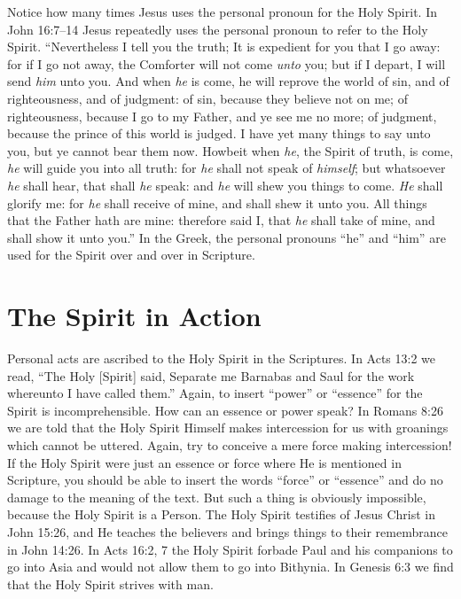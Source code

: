 Notice how many times Jesus uses the personal pronoun
for the Holy Spirit. In John 16:7–14 Jesus repeatedly
uses the personal pronoun to refer to the Holy Spirit. “Nevertheless
I tell you the truth; It is expedient for you that I go
away: for if I go not away, the Comforter will not come \emph{unto}
you; but if I depart, I will send \emph{him} unto you. And when \emph{he}
is come, he will reprove the world of sin, and of righteousness,
and of judgment: of sin, because they believe not on
me; of righteousness, because I go to my Father, and ye see
me no more; of judgment, because the prince of this world
is judged. I have yet many things to say unto you, but ye
cannot bear them now. Howbeit when \emph{he}, the Spirit of truth,
is come, \emph{he} will guide you into all truth: for \emph{he} shall not
speak of \emph{himself}; but whatsoever \emph{he} shall hear, that shall \emph{he}
speak: and \emph{he} will shew you things to come. \emph{He} shall glorify
me: for \emph{he} shall receive of mine, and shall shew it unto
you. All things that the Father hath are mine: therefore said
I, that \emph{he} shall take of mine, and shall show it unto you.” In
the Greek, the personal pronouns “he” and “him” are used
for the Spirit over and over in Scripture.


\section*{The Spirit in Action}

Personal acts are ascribed to the Holy Spirit in the Scriptures.
In Acts 13:2 we read, “The Holy [Spirit] said, Separate
me Barnabas and Saul for the work whereunto I have
called them.” Again, to insert “power” or “essence” for the
Spirit is incomprehensible. How can an essence or power
speak? In Romans 8:26 we are told that the Holy Spirit Himself
makes intercession for us with groanings which cannot
be uttered. Again, try to conceive a mere force making intercession!
If the Holy Spirit were just an essence or force
where He is mentioned in Scripture, you should be able to
insert the words “force” or “essence” and do no damage
to the meaning of the text. But such a thing is obviously
impossible, because the Holy Spirit is a Person. The Holy
Spirit testifies of Jesus Christ in John 15:26, and He teaches
the believers and brings things to their remembrance in
John 14:26. In Acts 16:2, 7 the Holy Spirit forbade Paul and
his companions to go into Asia and would not allow them
to go into Bithynia. In Genesis 6:3 we find that the Holy
Spirit strives with man.

